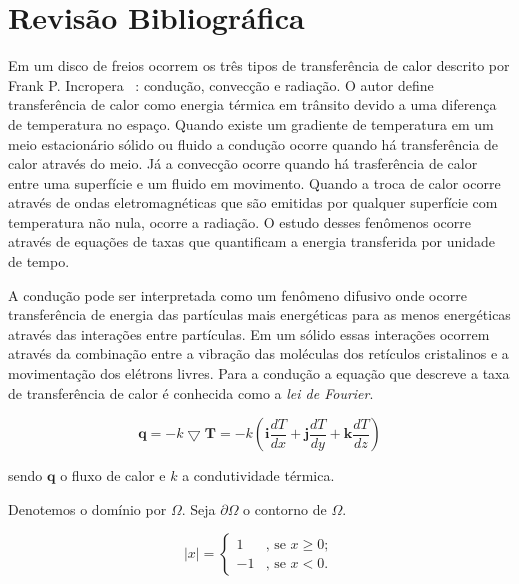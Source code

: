 \chapter{Revisão Bibliográfica}

Em um disco de freios ocorrem os três tipos de transferência de calor descrito por  Frank P. Incropera ~\cite{Lan50a}: condução, convecção e radiação. O autor define transferência de calor como energia térmica em trânsito devido a uma diferença de temperatura no espaço. Quando existe um gradiente de temperatura em um meio estacionário sólido ou fluido a condução ocorre quando há transferência de calor através do meio. Já a convecção ocorre quando há trasferência de calor entre uma superfície e um fluido em movimento. Quando a troca de calor ocorre através de ondas eletromagnéticas que são emitidas por qualquer superfície com temperatura não nula, ocorre a radiação. O estudo desses fenômenos ocorre através de equações de taxas que quantificam a energia transferida por unidade de tempo.

A condução pode ser interpretada como um fenômeno difusivo onde ocorre transferência de energia das partículas mais energéticas para as menos energéticas através das interações entre partículas. Em um sólido essas interações ocorrem através da combinação entre a vibração das moléculas dos retículos cristalinos e a movimentação dos elétrons livres. Para a condução a equação que descreve a taxa de transferência de calor é conhecida como a \textit{lei de Fourier}.

$$ \textbf{q} = -k \bigtriangledown \textbf{T} = -k \left(\textbf{i} \frac{dT}{dx} + \textbf{j} \frac{dT}{dy} + \textbf{k} \frac{dT}{dz} \right) $$

sendo $\textbf{q}$ o fluxo de calor e $k$ a condutividade térmica.



Denotemos o domínio por $\Omega$. Seja $\partial \Omega$ o contorno de
$\Omega$.

\begin{equation}
	|x| = \left\{ \begin{array}{ll}
	1 & \mbox{, se } x \geq 0; \\
	-1 & \mbox{, se } x < 0. \end{array} \right.
\end{equation}

